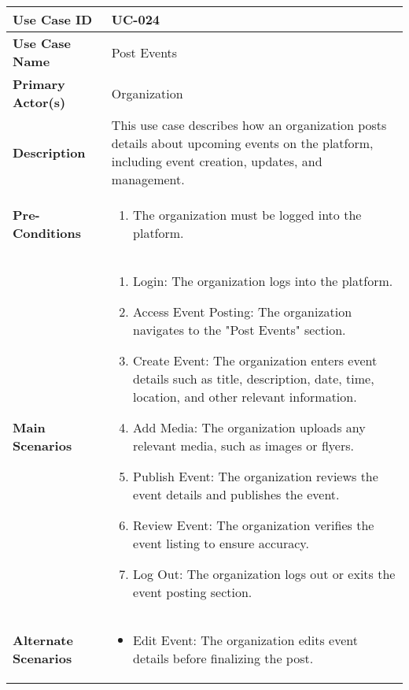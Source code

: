 \begin{table}[!ht]
    \centering
    \renewcommand{\arraystretch}{1.3} %
    \begin{tabularx}{\textwidth}{|l|X|}
        \hline
        \textbf{Use Case ID} & UC-024 \\
        \hline
        \textbf{Use Case Name} & Post Events \\
        \hline
        \textbf{Primary Actor(s)} & Organization \\
        \hline
        \textbf{Description} & This use case describes how an organization posts details about upcoming events on the platform, including event creation, updates, and management. \\
        \hline
        \textbf{Pre-Conditions} & 
        \begin{enumerate}[label=\arabic*.,itemsep=0pt]
            \item The organization must be logged into the platform.
        \end{enumerate} \\
        \hline
        \textbf{Main Scenarios} & 
        \begin{enumerate}[label=\arabic*.,itemsep=0pt]
            \item Login: The organization logs into the platform.
            \item Access Event Posting: The organization navigates to the "Post Events" section.
            \item Create Event: The organization enters event details such as title, description, date, time, location, and other relevant information.
            \item Add Media: The organization uploads any relevant media, such as images or flyers.
            \item Publish Event: The organization reviews the event details and publishes the event.
            \item Review Event: The organization verifies the event listing to ensure accuracy.
            \item Log Out: The organization logs out or exits the event posting section.
        \end{enumerate} \\
        \hline
        \textbf{Alternate Scenarios} & 
        \begin{itemize}[label=--,itemsep=0pt]
            \item Edit Event: The organization edits event details before finalizing the post.

\end{itemize}
\end{tabularx}
\end{table}
